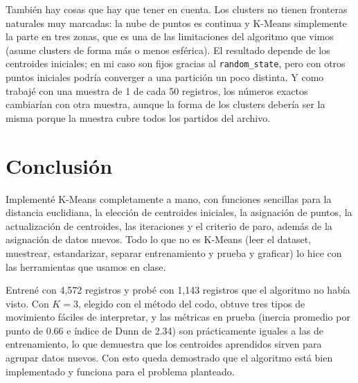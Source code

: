 \documentclass[11pt,a4paper]{article}
\begin{document}
También hay cosas que hay que tener en cuenta. Los clusters no tienen fronteras naturales muy marcadas: la nube de puntos es continua y K-Means simplemente la parte en tres zonas, que es una de las limitaciones del algoritmo que vimos (asume clusters de forma más o menos esférica). El resultado depende de los centroides iniciales; en mi caso son fijos gracias al \texttt{random\_state}, pero con otros puntos iniciales podría converger a una partición un poco distinta. Y como trabajé con una muestra de 1 de cada 50 registros, los números exactos cambiarían con otra muestra, aunque la forma de los clusters debería ser la misma porque la muestra cubre todos los partidos del archivo.

\section{Conclusión}

Implementé K-Means completamente a mano, con funciones sencillas para la distancia euclidiana, la elección de centroides iniciales, la asignación de puntos, la actualización de centroides, las iteraciones y el criterio de paro, además de la asignación de datos nuevos. Todo lo que no es K-Means (leer el dataset, muestrear, estandarizar, separar entrenamiento y prueba y graficar) lo hice con las herramientas que usamos en clase.

Entrené con 4{,}572 registros y probé con 1{,}143 registros que el algoritmo no había visto. Con $K=3$, elegido con el método del codo, obtuve tres tipos de movimiento fáciles de interpretar, y las métricas en prueba (inercia promedio por punto de 0.66 e índice de Dunn de 2.34) son prácticamente iguales a las de entrenamiento, lo que demuestra que los centroides aprendidos sirven para agrupar datos nuevos. Con esto queda demostrado que el algoritmo está bien implementado y funciona para el problema planteado.
\end{document}
